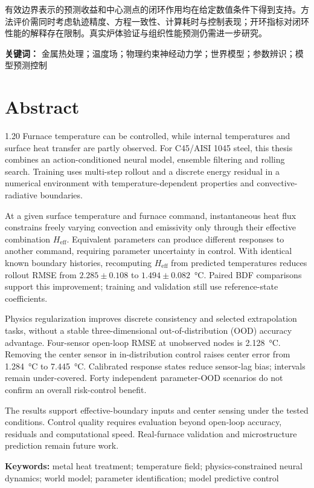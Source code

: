 \documentclass[UTF8,zihao=-4,openany,fontset=mac]{ctexrep}
\newcommand{\Heff}{{H_{\mathrm{eff}}}}
\begin{document}
有效边界表示的预测收益和中心测点的闭环作用均在给定数值条件下得到支持。方法评价需同时考虑轨迹精度、方程一致性、计算耗时与控制表现；开环指标对闭环性能的解释存在限制。真实炉体验证与组织性能预测仍需进一步研究。

\noindent\textbf{关键词：} 金属热处理；温度场；物理约束神经动力学；世界模型；参数辨识；模型预测控制

\chapter*{Abstract}
\begin{spacing}{1.20}
Furnace temperature can be controlled, while internal temperatures and surface heat transfer are partly observed. For C45/AISI 1045 steel, this thesis combines an action-conditioned neural model, ensemble filtering and rolling search. Training uses multi-step rollout and a discrete energy residual in a numerical environment with temperature-dependent properties and convective-radiative boundaries.

At a given surface temperature and furnace command, instantaneous heat flux constrains freely varying convection and emissivity only through their effective combination $\Heff$. Equivalent parameters can produce different responses to another command, requiring parameter uncertainty in control. With identical known boundary histories, recomputing $\Heff$ from predicted temperatures reduces rollout RMSE from $2.285\pm0.108$ to $1.494\pm0.082$~\si{\degreeCelsius}. Paired BDF comparisons support this improvement; training and validation still use reference-state coefficients.

Physics regularization improves discrete consistency and selected extrapolation tasks, without a stable three-dimensional out-of-distribution (OOD) accuracy advantage. Four-sensor open-loop RMSE at unobserved nodes is \SI{2.128}{\degreeCelsius}. Removing the center sensor in in-distribution control raises center error from \SI{1.284}{\degreeCelsius} to \SI{7.445}{\degreeCelsius}. Calibrated response states reduce sensor-lag bias; intervals remain under-covered. Forty independent parameter-OOD scenarios do not confirm an overall risk-control benefit.

The results support effective-boundary inputs and center sensing under the tested conditions. Control quality requires evaluation beyond open-loop accuracy, residuals and computational speed. Real-furnace validation and microstructure prediction remain future work.

\noindent\textbf{Keywords:} metal heat treatment; temperature field; physics-constrained neural dynamics; world model; parameter identification; model predictive control
\end{spacing}
\end{document}
